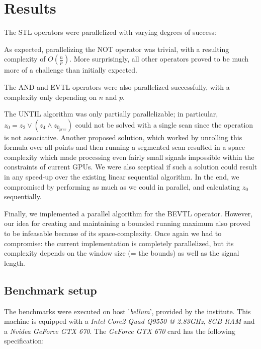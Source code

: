 \documentclass[a4paper,10pt]{article}
\renewcommand{\And}{\wedge}
\newcommand{\Or}{\vee}
\begin{document}

\section{Results}

The STL operators were parallelized with varying degrees of success:

As expected, parallelizing the NOT operator was trivial, with a resulting complexity of $O(\frac{n}{p})$. More surprisingly, all other
operators proved to be much more of a challenge than initially expected.

The AND and EVTL operators were also parallelized successfully, with a complexity only depending on $n$ and $p$.

The UNTIL algorithm was only partially parallelizable; in particular,
$z_0 = z_2 \Or (z_4 \And z_{0_{prev}})$ could not be solved with a single scan since
the operation is not associative. Another proposed solution, which worked by unrolling this formula over all points
and then running a segmented scan resulted in a space complexity which made processing even fairly small signals impossible within the constraints of current GPUs. We were also sceptical if such a solution could result in any speed-up over
the existing linear sequential algorithm. In the end, we compromised by performing
as much as we could in parallel, and calculating $z_0$ sequentially.

Finally, we implemented a parallel algorithm for the BEVTL operator. However,
our idea for creating and maintaining a bounded running maximum also proved to
be infeasable because of its space-complexity. Once again we had to compromise:
the current implementation is completely parallelized, but its complexity depends
on the window size (= the bounds) as well as the signal length.


\subsection{Benchmark setup}

The benchmarks were executed on host '{\it bellum}', provided by the institute. This machine is equipped with a {\it Intel Core2 Quad Q9550 @ 2.83GHz}, {\it 8GB RAM} and a {\it Nvidea GeForce GTX 670}. The {\it GeForce GTX 670} card has the following specification:
\end{document}
